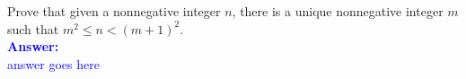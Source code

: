 \item{}
Prove that given a nonnegative integer $n$, there is a unique nonnegative
integer $m$ such that $m^2\le n<(m+1)^2$.\\[12pt]
\ifanswers
\textcolor{blue}{
\textbf{Answer:}\\[6pt]
answer goes here
}
\newpage
\fi
